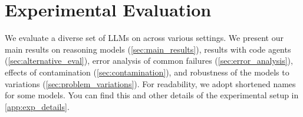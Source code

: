\section{Experimental Evaluation} \label{sec:eval}
 
We evaluate a diverse set of LLMs on \mc across various settings.
We present our main results on reasoning models (\cref{sec:main_results}), results with code agents (\cref{sec:alternative_eval}), error analysis of common failures (\cref{sec:error_analysis}), effects of contamination (\cref{sec:contamination}), and robustness of the models to variations (\cref{sec:problem_variations}). 
For readability, we adopt shortened names for some models. You can find this and other details of the experimental setup in \cref{app:exp_details}. 








